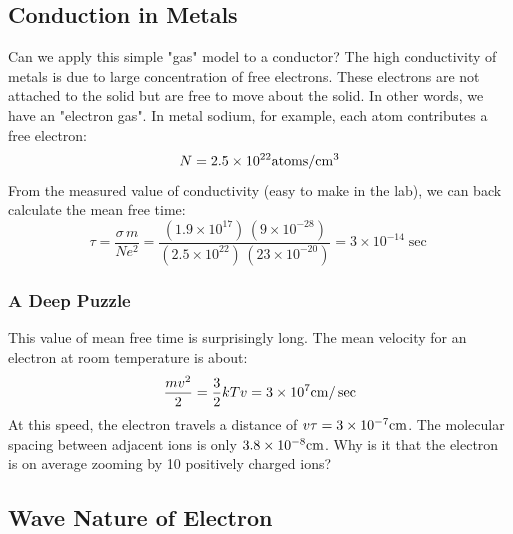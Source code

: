 \subsection{Conduction in Metals}




Can we apply this simple "gas" model to a conductor?  The  high conductivity of metals is due to large concentration of free electrons.   These electrons are not attached to the solid but are free to move about the solid.  In other words, we have an "electron gas".   In metal sodium, for example,  each atom contributes a free electron: 
\[
        N = 2.5 \times {10^{22}}{\rm{atoms/c}}{{\rm{m}}^{\rm{3}}}
\]
From the measured value of conductivity (easy to make in the lab), we can back calculate the mean free time:
\begin{equation}\tau  = \frac{{\sigma \,m}}{{N{e^2}}} = \frac{{\left( {1.9 \times {{10}^{17}}} \right)\,\left( {9 \times {{10}^{ - 28}}} \right)}}{{\left( {2.5 \times {{10}^{22}}} \right)\,\left( {23 \times {{10}^{ - 20}}} \right)}} = 3 \times {10^{ - 14}}\sec
\end{equation}


\subsubsection{A Deep Puzzle}


This value of mean free time is surprisingly long.  The mean velocity for an electron at room temperature is about: 
\begin{equation}
        \frac{{m{v^2}}}{2} = \frac{3}{2}kT  v = 3 \times {10^7}{\rm{cm}}/\sec
\end{equation}
At this speed, the electron travels a distance of $v\tau  = 3 \times {10^{ - 7}}{\rm{cm}}$.  The molecular spacing between adjacent ions is only $3.8 \times {10^{ - 8}}{\rm{cm}}$.  Why is it that the electron is on average zooming by 10 positively charged ions?


\subsection{Wave Nature of Electron}


